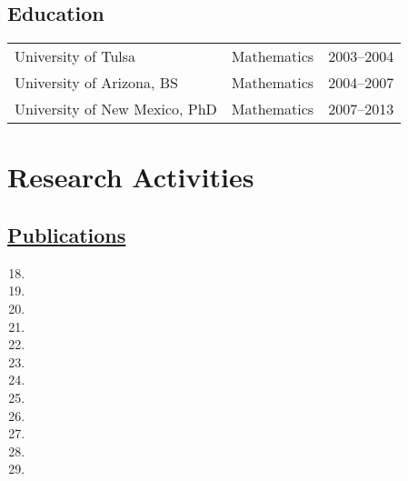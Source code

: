 \documentclass[a4paper,10pt]{article}
\newenvironment{benumerate}[1]{
	\let\oldItem\item
	\def\item{\addtocounter{enumi}{-2}\oldItem}
	\begin{enumerate}
		\setcounter{enumi}{#1}
		\addtocounter{enumi}{1}
	}{
	\end{enumerate}
}
\begin{document}
 \subsection*{Education}
 \begin{flushleft}
\begin{tabular}{p{2in} p{1in}p{1in}}
University of Tulsa & Mathematics & 2003--2004 \\
University of Arizona, BS & Mathematics & 2004--2007\\
University of New Mexico, PhD &  Mathematics & 2007--2013
 \end{tabular}
 \end{flushleft}

\iffalse 
\subsection*{Research Interests}
Broad:  Algebraic Geometry, Differential Algebra, Number Theory, Applied Model Theory  \\
Specific: Deformation Theory, Diophantine Geometry, Differential Algebra and Witt vectors.
\fi 

\section*{Research Activities}

\subsection*{\href{https://arxiv.org/search/math?searchtype=author&query=Dupuy,+T}{Publications}}
\begin{benumerate}{17}
	\item {}
	\item  {} 
	\item  {}
	\item {}
	\item {}
	\item {}
	\item {}
	\item {}
	\item {}
	\item {}
	\item {}
	\item {}
\end{benumerate}
\end{document}
